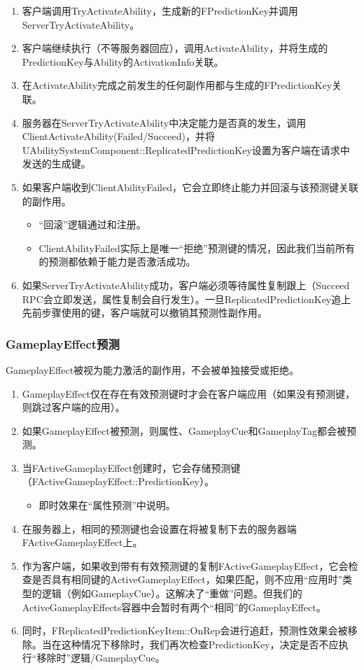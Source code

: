 \documentclass[10pt,CJKmath]{ctexart}
\begin{document}
\begin{enumerate}
	\item 客户端调用TryActivateAbility，生成新的FPredictionKey并调用ServerTryActivateAbility。
	\item 客户端继续执行（不等服务器回应），调用ActivateAbility，并将生成的PredictionKey与Ability的ActivationInfo关联。
	\item 在ActivateAbility完成之前发生的任何副作用都与生成的FPredictionKey关联。
	\item 服务器在ServerTryActivateAbility中决定能力是否真的发生，调用ClientActivateAbility(Failed/Succeed)，并将UAbilitySystemComponent::ReplicatedPredictionKey设置为客户端在请求中发送的生成键。
	\item 如果客户端收到ClientAbilityFailed，它会立即终止能力并回滚与该预测键关联的副作用。
	\begin{itemize}
		\item “回滚”逻辑通过和注册。
		\item ClientAbilityFailed实际上是唯一“拒绝”预测键的情况，因此我们当前所有的预测都依赖于能力是否激活成功。
	\end{itemize}
	\item 如果ServerTryActivateAbility成功，客户端必须等待属性复制跟上（Succeed RPC会立即发送，属性复制会自行发生）。一旦ReplicatedPredictionKey追上先前步骤使用的键，客户端就可以撤销其预测性副作用。
\end{enumerate}

\subsubsection{GameplayEffect预测}
GameplayEffect被视为能力激活的副作用，不会被单独接受或拒绝。

\begin{enumerate}
	\item GameplayEffect仅在存在有效预测键时才会在客户端应用（如果没有预测键，则跳过客户端的应用）。
	\item 如果GameplayEffect被预测，则属性、GameplayCue和GameplayTag都会被预测。
	\item 当FActiveGameplayEffect创建时，它会存储预测键（FActiveGameplayEffect::PredictionKey）。
	\begin{itemize}
		\item 即时效果在“属性预测”中说明。
	\end{itemize}
	\item 在服务器上，相同的预测键也会设置在将被复制下去的服务器端FActiveGameplayEffect上。
	\item 作为客户端，如果收到带有有效预测键的复制FActiveGameplayEffect，它会检查是否具有相同键的ActiveGameplayEffect，如果匹配，则不应用“应用时”类型的逻辑（例如GameplayCue）。这解决了“重做”问题。但我们的ActiveGameplayEffects容器中会暂时有两个“相同”的GameplayEffect。
	\item 同时，FReplicatedPredictionKeyItem::OnRep会进行追赶，预测性效果会被移除。当在这种情况下移除时，我们再次检查PredictionKey，决定是否不应执行“移除时”逻辑/GameplayCue。
\end{enumerate}
\end{document}
